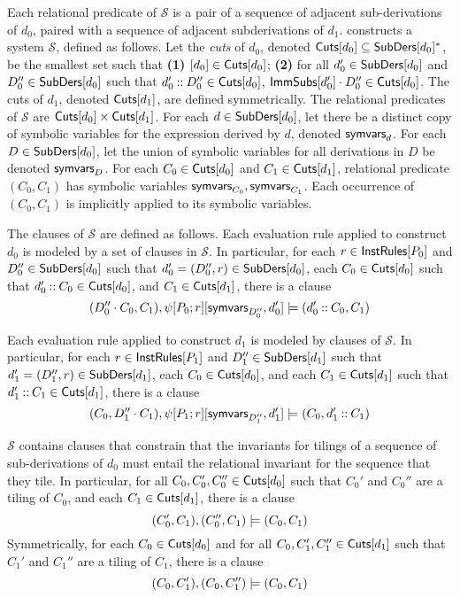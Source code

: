 Each relational predicate of $\mathcal{S}$ is a pair of a sequence of
adjacent sub-derivations of $d_0$, paired with a sequence of adjacent
subderivations of $d_1$.
\verifyders constructs a system $\mathcal{S}$, defined as follows.
%
Let the \emph{cuts} of $d_0$, denoted $\mathsf{Cuts}[ d_0 ] \subseteq
\mathsf{SubDers}[ d_0 ]^{*}$, be the smallest set such that %
\textbf{(1)} $[ d_0 ] \in \mathsf{Cuts}[ d_0 ]$; %
\textbf{(2)} for all $d_0' \in \mathsf{SubDers}[ d_0 ]$ and $D_0'' \in
\mathsf{SubDers}[ d_0 ]$ such that $d_0' \mathbin{::} D_0'' \in \mathsf{Cuts}[ d_0 ]$,
$\mathsf{ImmSubs}[ d_0' ] \cdot D_0'' \in \mathsf{Cuts}[ d_0 ]$.
%
The cuts of $d_1$, denoted $\mathsf{Cuts}[ d_1 ]$, are defined symmetrically.
The relational predicates of $\mathcal{S}$ are $\mathsf{Cuts}[ d_0 ] \times
\mathsf{Cuts}[ d_1 ]$.
%
For each $d \in \mathsf{SubDers}[ d_0 ]$, let there be a distinct copy of
symbolic variables for the expression derived by $d$, denoted
$\mathsf{symvars}_{d}$.
%
For each $D \in \mathsf{SubDers}[ d_0 ]$, let the union of symbolic variables
for all derivations in $D$ be denoted $\mathsf{symvars}_{D}$.
%
For each $C_0 \in \mathsf{Cuts}[ d_0 ]$ and $C_1 \in \mathsf{Cuts}[ d_1 ]$, relational
predicate $(C_0, C_1)$ has symbolic variables $\mathsf{symvars}_{C_0},
\mathsf{symvars}_{C_1}$.
%
Each occurrence of $(C_0, C_1)$ is implicitly applied to its symbolic
variables.

The clauses of $\mathcal{S}$ are defined as follows.
%
Each evaluation rule applied to construct $d_0$ is modeled by a set of
clauses in $\mathcal{S}$.
In particular, for each $r \in \mathsf{InstRules}[ P_0 ]$ and $D_0'' \in
\mathsf{SubDers}[  d_0  ]$ such that $d_0' = (D_0'', r) \in \mathsf{SubDers}[  d_0  ]$, %
each $C_0 \in \mathsf{Cuts}[ d_0 ]$ such that $d_0' \mathbin{::} C_0 \in \mathsf{Cuts}[  d_0  ]$,
and %
$C_1 \in \mathsf{Cuts}[  d_1  ]$, there is a clause %
\[ (D_0'' \concat C_0, C_1), %
\symstep{ P_0 }{ r }[ \symvars{ D_0'' }, d_0' ] \entails %
(d_0' \cons C_0, C_1) \]

Each evaluation rule applied to construct $d_1$ is modeled by clauses
of $\mathcal{S}$.
%
In particular, for each $r \in \mathsf{InstRules}[ P_1 ]$ and $D_1'' \in
\mathsf{SubDers}[ d_1 ]$ such that $d_1' = (D_1'', r) \in \mathsf{SubDers}[  d_1  ]$, %
each $C_0 \in \mathsf{Cuts}[ d_0 ]$, and %
each $C_1 \in \mathsf{Cuts}[  d_1  ]$ such that $d_1' \mathbin{::} C_1 \in \mathsf{Cuts}[ d_1 ]$,
there is a clause
\[ (C_0, D_1'' \concat C_1), %
\symstep{ P_1 }{ r }[ \symvars{ D_1'' }, d_1' ] \entails %
(C_0, d_1' \cons C_1) \]

$\mathcal{S}$ contains clauses that constrain that the invariants for
tilings of a sequence of sub-derivations of $d_0$ must entail the
relational invariant for the sequence that they tile.
%
In particular, for all $C_0, C_0', C_0'' \in \mathsf{Cuts}[ d_0 ]$ such that
$C_0'$ and $C_0''$ are a tiling of $C_0$, and %
each $C_1 \in \mathsf{Cuts}[ d_1 ]$, there is a clause
\[ (C_0', C_1), (C_0'', C_1) \models (C_0, C_1)
\]
%
Symmetrically, for each $C_0 \in \mathsf{Cuts}[ d_0 ]$ and %
for all $C_0, C_1', C_1'' \in \mathsf{Cuts}[ d_1 ]$ such that $C_1'$ and $C_1''$
are a tiling of $C_1$, %
there is a clause 
\[ (C_0, C_1'), (C_0, C_1'') \models (C_0, C_1)
\]

